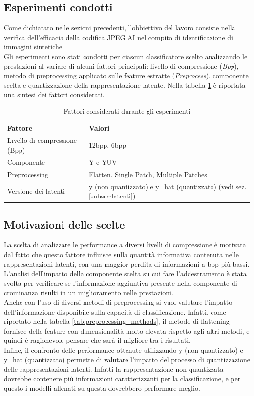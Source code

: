 \subsection{Esperimenti condotti}\label{sec:experiments}
Come dichiarato nelle sezioni precedenti, l'obbiettivo del lavoro consiste nella verifica dell'efficacia della codifica JPEG AI nel compito di identificazione di immagini sintetiche.\\
Gli esperimenti sono stati condotti per ciascun classificatore scelto analizzando le prestazioni al variare di alcuni fattori principali: livello di compressione (\textit{Bpp}), metodo di preprocessing applicato sulle feature estratte (\textit{Preprocess}), componente scelta e quantizzazione della rappresentazione latente. Nella tabella \ref{tab:experimentalfactors} è riportata una sintesi dei fattori considerati.
\begin{table}[H]
\centering
\caption{Fattori considerati durante gli esperimenti}\label{tab:experimentalfactors}
\begin{tabularx}{\textwidth}{l >{\raggedright\arraybackslash}X}
\toprule
\textbf{Fattore} & \textbf{Valori} \\
\midrule
Livello di compressione (Bpp) & 12bpp, 6bpp \\
\midrule
Componente & Y e YUV \\
\midrule
Preprocessing & Flatten, Single Patch, Multiple Patches \\
\midrule
Versione dei latenti & y (non quantizzato) e y\_hat (quantizzato) (vedi sez. \ref{subsec:latenti})\\
\bottomrule
\end{tabularx}
\end{table}
\subsection{Motivazioni delle scelte}\label{subsec:choices}
La scelta di analizzare le performance a diversi livelli di compressione è motivata dal fatto che questo fattore influisce sulla quantità informativa contenuta nelle rappresentazioni latenti, con una maggior perdita di informazioni a bpp più bassi.\\
L'analisi dell'impatto della componente scelta su cui fare l'addestramento è stata svolta per verificare se l'informazione aggiuntiva presente nella componente di crominanza risulti in un miglioramento nelle prestazioni.\\
Anche con l'uso di diversi metodi di preprocessing si vuol valutare l'impatto dell'informazione disponibile sulla capacità di classificazione. Infatti, come riportato nella tabella \ref{tab:preprocessing_methods}, il metodo di flattening fornisce delle feature con dimensionalità molto elevata rispetto agli altri metodi, e quindi è ragionevole pensare che sarà il migliore tra i risultati.\\
Infine, il confronto delle performance ottenute utilizzando y (non quantizzato) e y\_hat (quantizzato) permette di valutare l'impatto del processo di quantizzazione delle rappresentazioni latenti. Infatti la rappresentazione non quantizzata dovrebbe contenere più informazioni caratterizzanti per la classificazione, e per questo i modelli allenati su questa dovrebbero performare meglio.

